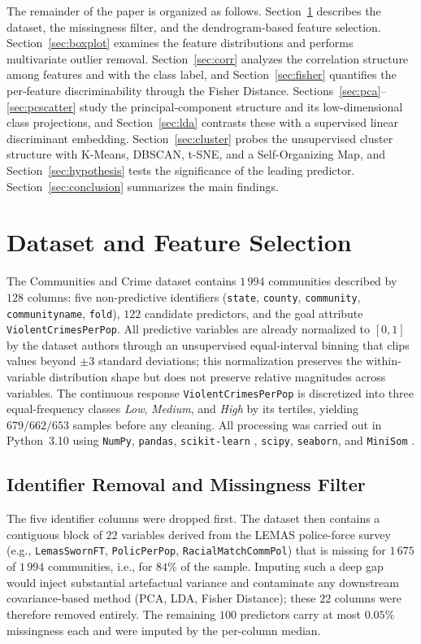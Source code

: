 \documentclass{ieeeaccess}
\begin{document}
The remainder of the paper is organized as follows. Section~\ref{sec:dataset} describes the dataset, the missingness filter, and the dendrogram-based feature selection. Section~\ref{sec:boxplot} examines the feature distributions and performs multivariate outlier removal. Section~\ref{sec:corr} analyzes the correlation structure among features and with the class label, and Section~\ref{sec:fisher} quantifies the per-feature discriminability through the Fisher Distance. Sections~\ref{sec:pca}--\ref{sec:pcscatter} study the principal-component structure and its low-dimensional class projections, and Section~\ref{sec:lda} contrasts these with a supervised linear discriminant embedding. Section~\ref{sec:cluster} probes the unsupervised cluster structure with K-Means, DBSCAN, t-SNE, and a Self-Organizing Map, and Section~\ref{sec:hypothesis} tests the significance of the leading predictor. Section~\ref{sec:conclusion} summarizes the main findings.

\section{Dataset and Feature Selection}
\label{sec:dataset}
The Communities and Crime dataset \cite{uciccrime} contains $1\,994$ communities described by $128$ columns: five non-predictive identifiers (\texttt{state}, \texttt{county}, \texttt{community}, \texttt{communityname}, \texttt{fold}), $122$ candidate predictors, and the goal attribute \texttt{ViolentCrimesPerPop}. All predictive variables are already normalized to $[0,1]$ by the dataset authors through an unsupervised equal-interval binning that clips values beyond $\pm 3$ standard deviations; this normalization preserves the within-variable distribution shape but does not preserve relative magnitudes across variables. The continuous response \texttt{ViolentCrimesPerPop} is discretized into three equal-frequency classes \emph{Low}, \emph{Medium}, and \emph{High} by its tertiles, yielding $679 / 662 / 653$ samples before any cleaning. All processing was carried out in Python~3.10 using \texttt{NumPy}, \texttt{pandas}, \texttt{scikit-learn} \cite{pedregosa}, \texttt{scipy}, \texttt{seaborn}, and \texttt{MiniSom} \cite{minisom}.

\subsection{Identifier Removal and Missingness Filter}
\label{ssec:miss}
The five identifier columns were dropped first. The dataset then contains a contiguous block of $22$ variables derived from the LEMAS police-force survey (e.g., \texttt{LemasSwornFT}, \texttt{PolicPerPop}, \texttt{RacialMatchCommPol}) that is missing for $1\,675$ of $1\,994$ communities, i.e., for $84\%$ of the sample. Imputing such a deep gap would inject substantial artefactual variance and contaminate any downstream covariance-based method (PCA, LDA, Fisher Distance); these $22$ columns were therefore removed entirely. The remaining $100$ predictors carry at most $0.05\%$ missingness each and were imputed by the per-column median.
\end{document}
